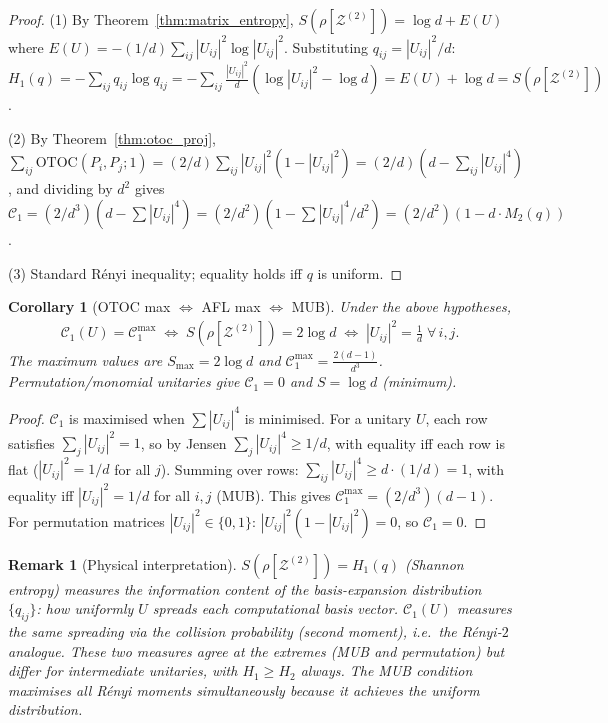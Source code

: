 \documentclass[12pt,a4paper]{article}
\newtheorem{corollary}[theorem]{Corollary}
\newtheorem{remark}[theorem]{Remark}
\begin{document}
\begin{proof}
(1) By Theorem~\ref{thm:matrix_entropy}, $S(\rho[\mathcal{Z}^{(2)}])=\log d+E(U)$ where
$E(U)=-(1/d)\sum_{ij}|U_{ij}|^2\log|U_{ij}|^2$.  Substituting $q_{ij}=|U_{ij}|^2/d$:
$H_1(q) = -\sum_{ij}q_{ij}\log q_{ij} = -\sum_{ij}\frac{|U_{ij}|^2}{d}(\log|U_{ij}|^2-\log d)
= E(U)+\log d = S(\rho[\mathcal{Z}^{(2)}])$.

(2) By Theorem~\ref{thm:otoc_proj}, $\sum_{ij}\mathrm{OTOC}(P_i,P_j;1) = (2/d)\sum_{ij}|U_{ij}|^2(1-|U_{ij}|^2)=(2/d)(d-\sum_{ij}|U_{ij}|^4)$,
and dividing by $d^2$ gives $\mathcal{C}_1 = (2/d^3)(d-\sum|U_{ij}|^4)
= (2/d^2)(1-\sum|U_{ij}|^4/d^2)=(2/d^2)(1-d\cdot M_2(q))$.

(3) Standard Rényi inequality; equality holds iff $q$ is uniform.
\end{proof}

\begin{corollary}[OTOC max $\Leftrightarrow$ AFL max $\Leftrightarrow$ MUB]
Under the above hypotheses,
\begin{align*}
  \mathcal{C}_1(U)=\mathcal{C}_1^{\max}
  \;\Longleftrightarrow\;
  S(\rho[\mathcal{Z}^{(2)}])=2\log d
  \;\Longleftrightarrow\;
  |U_{ij}|^2=\tfrac{1}{d}\;\forall\,i,j.
\end{align*}
The maximum values are $S_{\max}=2\log d$ and $\mathcal{C}_1^{\max}=\frac{2(d-1)}{d^3}$.
Permutation/monomial unitaries give $\mathcal{C}_1=0$ and $S=\log d$ (minimum).
\end{corollary}

\begin{proof}
$\mathcal{C}_1$ is maximised when $\sum|U_{ij}|^4$ is minimised.  For a unitary $U$, each
row satisfies $\sum_j|U_{ij}|^2=1$, so by Jensen $\sum_j|U_{ij}|^4\geq 1/d$, with
equality iff each row is flat ($|U_{ij}|^2=1/d$ for all $j$).  Summing over rows:
$\sum_{ij}|U_{ij}|^4\geq d\cdot(1/d)=1$, with equality iff $|U_{ij}|^2=1/d$ for all
$i,j$ (MUB).  This gives $\mathcal{C}_1^{\max}=(2/d^3)(d-1)$.
For permutation matrices $|U_{ij}|^2\in\{0,1\}$:
$|U_{ij}|^2(1-|U_{ij}|^2)=0$, so $\mathcal{C}_1=0$.
\end{proof}

\begin{remark}[Physical interpretation]
$S(\rho[\mathcal{Z}^{(2)}])=H_1(q)$ (Shannon entropy) measures the \emph{information content}
of the basis-expansion distribution $\{q_{ij}\}$: how uniformly $U$ spreads each
computational basis vector.  $\mathcal{C}_1(U)$ measures the same spreading via the
\emph{collision probability} (second moment), i.e.\ the Rényi-$2$ analogue.  These two
measures agree at the extremes (MUB and permutation) but differ for intermediate
unitaries, with $H_1\geq H_2$ always.  The MUB condition maximises all Rényi moments
simultaneously because it achieves the uniform distribution.
\end{remark}
\end{document}
